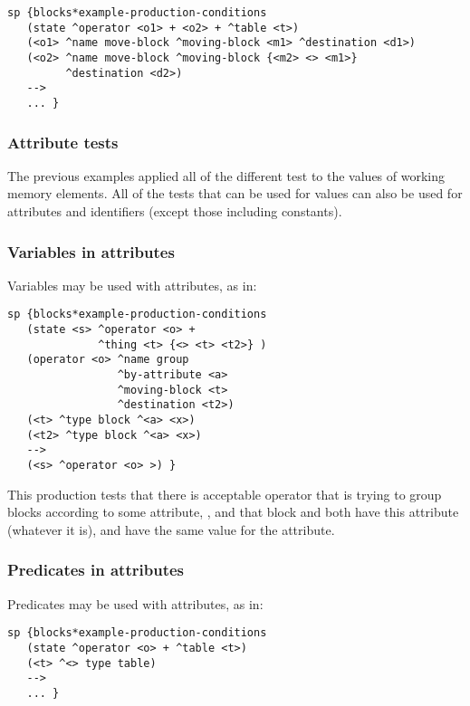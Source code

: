 \begin{verbatim}
sp {blocks*example-production-conditions
   (state ^operator <o1> + <o2> + ^table <t>)
   (<o1> ^name move-block ^moving-block <m1> ^destination <d1>)
   (<o2> ^name move-block ^moving-block {<m2> <> <m1>} 
         ^destination <d2>)
   -->
   ... }
\end{verbatim}

\subsubsection{Attribute tests}

The previous examples applied all of the different test to the values of
working memory elements. 
All of the tests that can be used for values can also be used for
attributes and identifiers (except those including constants).

\subsubsection*{Variables in attributes}

Variables may be used with attributes, as in:

\begin{verbatim}
sp {blocks*example-production-conditions
   (state <s> ^operator <o> + 
              ^thing <t> {<> <t> <t2>} )
   (operator <o> ^name group 
                 ^by-attribute <a>
                 ^moving-block <t>
                 ^destination <t2>)
   (<t> ^type block ^<a> <x>)
   (<t2> ^type block ^<a> <x>)
   -->
   (<s> ^operator <o> >) }
\end{verbatim}

This production tests that there is acceptable operator that is trying to
group blocks according to some attribute, , and that block
 and  both have this attribute (whatever it is), and have
the same value for the attribute.


\subsubsection*{Predicates in attributes}

Predicates may be used with attributes, as in:

\begin{verbatim}
sp {blocks*example-production-conditions
   (state ^operator <o> + ^table <t>)
   (<t> ^<> type table)
   -->
   ... }
\end{verbatim}

